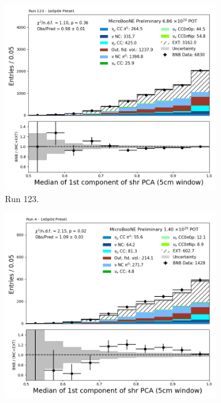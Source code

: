 \begin{figure}[H]
    \centering
    \begin{subfigure}[t]{0.32\linewidth}
        \includegraphics[width=\linewidth]{technote/Appendix_Preselection/Figures/1e0p0pi/Run123/shrPCA1CMed_5cm_Run123_1e0p0pi_Presel.png}
        \caption{Run 123.}
    \end{subfigure}%
    \hspace{0.2cm}%
    \begin{subfigure}[t]{0.32\linewidth}
        \includegraphics[width=\linewidth]{technote/Appendix_Preselection/Figures/1e0p0pi/Run4b/shrPCA1CMed_5cm_Run4b_1e0p0pi_Presel.png}

\end{subfigure}
\end{figure}
